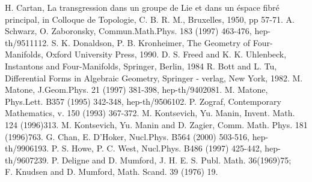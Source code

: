 \documentclass[a4paper,12pt]{article}
\begin{document}
\begin{thebibliography}{99}
H. Cartan, La transgression dans un groupe de Lie 
et dans un \'{e}space fibr\'{e} principal, in Colloque de Topologie, 
C. B. R. M., Bruxelles, 1950, pp 57-71.
 A. Schwarz, O. Zaboronsky, 
Commun.Math.Phys. 183 (1997) 463-476, hep-th/9511112.
S. K. Donaldson, P. B. Kronheimer, The Geometry of 
Four-Manifolds, Oxford University Press, 1990.
D. S. Freed and K. K. Uhlenbeck, Instantons and 
Four-Manifolds, Springer, Berlin, 1984
R. Bott and L. Tu, Differential Forms in Algebraic 
Geometry, Springer - verlag, New York, 1982. 
M. Matone, J.Geom.Phys. 21 (1997) 381-398, hep-th/9402081.
M. Matone, Phys.Lett. B357 (1995) 342-348, hep-th/9506102.
P. Zograf, Contemporary Mathematics, v. 150 (1993) 367-372. 
M. Kontsevich, Yu. Manin, 
Invent. Math. 124 (1996)313. 
M. Kontsevich, Yu. Manin and D. Zagier, 
Comm. Math. Phys. 181 (1996)763.
 G. Chan, E. D'Hoker, Nucl.Phys. B564 (2000) 503-516, 
hep-th/9906193.
 P. S. Howe, P. C. West, Nucl.Phys. B486 (1997) 425-442, 
hep-th/9607239.
P. Deligne and D. Mumford, J. H. E. S. Publ. Math. 
36(1969)75; \\
F. Knudsen and D. Mumford, Math. Scand. 39 (1976) 19.  
\end{thebibliography}
\vfill\eject
  


  
\end{document}
